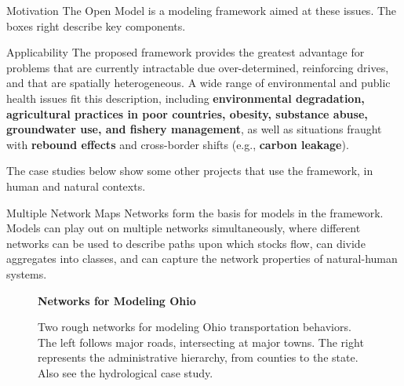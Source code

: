 \documentclass[final]{beamer}
\newlength{\onecolwid}
\begin{document}
\begin{frame}[fragile]
\begin{columns}[t]
\begin{column}{\onecolwid}
\begin{block}{Motivation}
       \vspace{.7cm}
       The Open Model is a modeling framework aimed at these issues.  The
       boxes right describe key components.
     \end{block}
     
      \begin{block}{Applicability}
        The proposed framework provides the greatest advantage for
        problems that are currently intractable due over-determined,
        reinforcing drives, and that are spatially heterogeneous.  A
        wide range of environmental and public health issues fit this
        description, including {\bf environmental degradation,
          agricultural practices in poor countries, obesity, substance
          abuse, groundwater use, and fishery management}, as well as
        situations fraught with {\bf rebound effects} and cross-border
        shifts (e.g., {\bf carbon leakage}).

        \vspace{.5cm}
        The case studies below show some other projects that use the
        framework, in human and natural contexts.
     \end{block}

     \vspace{.3cm}
      \begin{alertblock}{Multiple Network Maps}
        Networks form the basis for models in the framework.  Models
        can play out on multiple networks simultaneously, where
        different networks can be used to describe paths upon which
        stocks flow, can divide aggregates into classes, and can
        capture the network properties of natural-human systems.
            
        \begin{figure}[h]
          {\bf Networks for Modeling Ohio}

          \vspace{.1cm}
          \caption*{Two rough networks for modeling Ohio
            transportation behaviors.  The left follows major roads,
            intersecting at major towns.  The right represents the
            administrative hierarchy, from counties to the state.
            Also see the hydrological case study.}
        \end{figure}
      \end{alertblock}

    \end{column}


\end{columns}
\end{frame}
\end{document}

